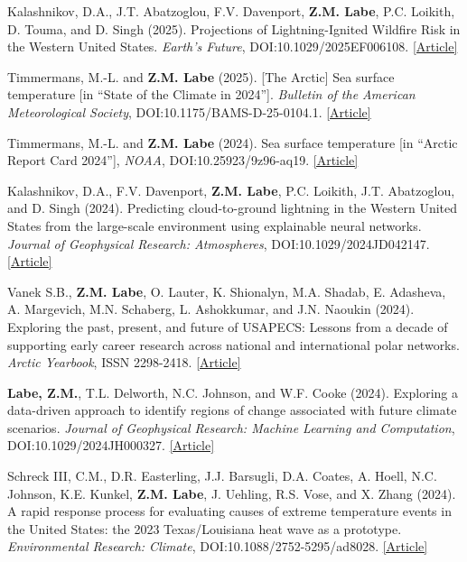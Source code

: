 \documentclass[margin,line,palatino,courier,10pt]{res}
\begin{document}
\begin{resume}
\begin{etaremune}[leftmargin=0in,topsep=0in,parsep=0in]
\item Kalashnikov, D.A., J.T. Abatzoglou, F.V. Davenport, \textbf{Z.M. Labe}, P.C. Loikith, D. Touma, and D. Singh (2025). Projections of Lightning-Ignited Wildfire Risk in the Western United States. \textit{Earth's Future}, DOI:10.1029/2025EF006108. \href{https://doi.org/10.1029/2025EF006108}{[Article]}
\item Timmermans, M.-L. and \textbf{Z.M. Labe} (2025). [The Arctic] Sea surface temperature [in ``State of the Climate in 2024'']. \textit{Bulletin of the American Meteorological Society}, DOI:10.1175/BAMS-D-25-0104.1. \href{https://doi.org/10.1175/BAMS-D-25-0104.1}{[Article]}
\item Timmermans, M.-L. and \textbf{Z.M. Labe} (2024). Sea surface temperature [in ``Arctic Report Card 2024''], \textit{NOAA}, DOI:10.25923/9z96-aq19. \href{https://arctic.noaa.gov/report-card/report-card-2024/sea-surface-temperature-2024/}{[Article]}
\item Kalashnikov, D.A., F.V. Davenport, \textbf{Z.M. Labe}, P.C. Loikith, J.T. Abatzoglou, and D. Singh (2024). Predicting cloud-to-ground lightning in the Western United States from the large-scale environment using explainable neural networks. \textit{Journal of Geophysical Research: Atmospheres}, DOI:10.1029/2024JD042147. \href{https://doi.org/10.1029/2024JD042147}{[Article]}
\item Vanek S.B., \textbf{Z.M. Labe}, O. Lauter, K. Shionalyn, M.A. Shadab, E. Adasheva, A. Margevich, M.N. Schaberg, L. Ashokkumar, and J.N. Naoukin (2024). Exploring the past, present, and future of USAPECS: Lessons from a decade of supporting early career research across national and international polar networks. \textit{Arctic Yearbook}, ISSN 2298-2418. \href{https://arcticyearbook.com/arctic-yearbook/2024/2024-briefing-notes/534-exploring-the-past-present-and-future-of-usapecs-lessons-from-a-decade-of-supporting-early-career-research-across-national-and-international-polar-networks}{[Article]}
\item \textbf{Labe, Z.M.}, T.L. Delworth, N.C. Johnson, and W.F. Cooke (2024). Exploring a data-driven approach to identify regions of change associated with future climate scenarios. \textit{Journal of Geophysical Research: Machine Learning and Computation}, DOI:10.1029/2024JH000327. \href{https://doi.org/10.1029/2024JH000327}{[Article]}
\item Schreck III, C.M., D.R. Easterling, J.J. Barsugli, D.A. Coates, A. Hoell, N.C. Johnson, K.E. Kunkel, \textbf{Z.M. Labe}, J. Uehling, R.S. Vose, and X. Zhang (2024). A rapid response process for evaluating causes of extreme temperature events in the United States: the 2023 Texas/Louisiana heat wave as a prototype. \textit{Environmental Research: Climate}, DOI:10.1088/2752-5295/ad8028. \href{https://iopscience.iop.org/article/10.1088/2752-5295/ad8028}{[Article]}

\end{etaremune}
\end{resume}
\end{document}
